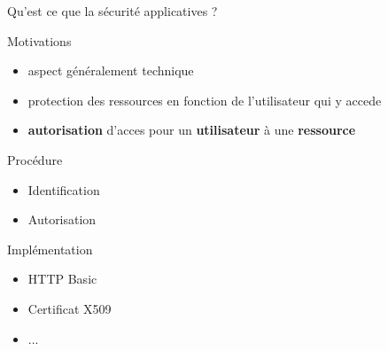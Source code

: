 \begin{frame}{Qu'est ce que la sécurité applicatives ?}
  \begin{block}{Motivations}
    \begin{itemize}
      \item aspect généralement technique
      \item protection des ressources en fonction de l’utilisateur qui y accede
      \item \textbf{autorisation} d’acces pour un \textbf{utilisateur} à une \textbf{ressource}
    \end{itemize}
  \end{block}

  \begin{block}{Procédure}
    \begin{itemize}
      \item Identification
      \item Autorisation
    \end{itemize}
  \end{block}
\end{frame}

\begin{frame}
  \begin{block}{Implémentation}
    \begin{itemize}
      \item HTTP Basic
      \item Certificat X509
      \item ...
    \end{itemize}
  \end{block}
\end{frame}
